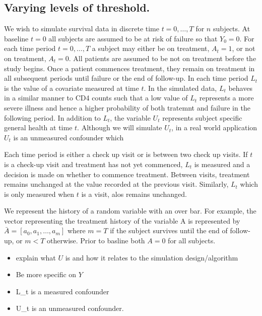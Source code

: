 \documentclass[11pt]{article}
\providecommand{\tightlist}{%
      \setlength{\itemsep}{0pt}\setlength{\parskip}{0pt}}
\begin{document}
\subsection{Varying levels of
threshold.}\label{varying-levels-of-threshold.}

We wish to simulate survival data in discrete time \(t = 0, \dots, T\)
for \(n\) subjects. At baseline \(t=0\) all subjects are assumed to be
at risk of failure so that \(Y_0 = 0\). For each time period
\(t = 0, \dots, T\) a subject may either be on treatment, \(A_t = 1\),
or not on treatment, \(A_t = 0\). All patients are assumed to be not on
treatment before the study begins. Once a patient commences treatment,
they remain on treatment in all subsequent periods until failure or the
end of follow-up. In each time period \(L_t\) is the value of a
covariate measured at time \(t\). In the simulated data, \(L_t\) behaves
in a similar manner to CD4 counts such that a low value of \(L_t\)
represents a more severe illness and hence a higher probability of both
tratemnt and failure in the following period. In addition to \(L_t\),
the variable \(U_t\) represents subject specific general health at time
\(t\). Although we will simulate \(U_t\), in a real world application
\(U_t\) is an unmeasured confounder which

Each time period is either a check up visit or is between two check up
visits. If \(t\) is a check-up visit and treatment has not yet
commenced, \(L_t\) is measured and a decision is made on whether to
commence treatment. Between visits, treatment remains unchanged at the
value recorded at the previous visit. Similarly, \(L_t\) which is only
measured when \(t\) is a visit, alos remains unchanged.

We represent the history of a random variable with an over bar. For
example, the vector representing the treatment history of the variable A
is represented by \(\bar A = [a_0, a_1, \dots, a_m]\) where \(m=T\) if
the subject survives until the end of follow-up, or \(m < T\) otherwise.
Prior to basline both \(A = 0\) for all subjects.

\begin{itemize}
\tightlist
\item
  explain what \(U\) is and how it relates to the simulation
  design/algorithm
\item
  Be more specific on \(Y\)
\item
  L\_t is a measured confounder
\item
  U\_t is an unmeasured confounder.
\end{itemize}
\end{document}
